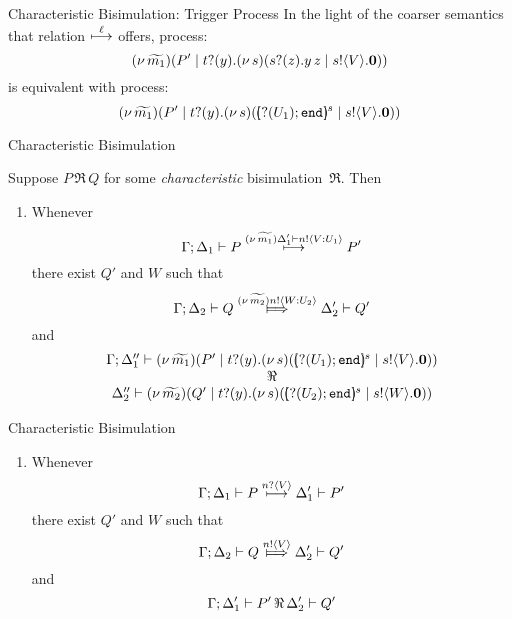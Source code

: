 \documentclass{beamer}
\begin{document}
	\begin{frame}{Characteristic Bisimulation: Trigger Process}
		In the light of the coarser semantics that
		relation $\stackrel{\ell}{\longmapsto}$ offers, process:
		\[
			(\nu\, \widetilde{m_1})(P' \;|\; t ? (y) .(\nu\, s)(s ? (z) . y\, {z} \;|\; s ! \langle V \rangle . \mathbf{0}))
		\]
		is equivalent with process:
		\[
			(\nu\, \widetilde{m_1})(P' \;|\; t ? (y) .(\nu\, s)([\!\!(? (U_1) ; \mathtt{end})\!\!]^{s} \;|\; s ! \langle V \rangle . \mathbf{0}))
		\]
	\end{frame}

	\begin{frame}{Characteristic Bisimulation}

		Suppose $P\, \Re\, Q$ for some {\em characteristic} bisimulation~$\Re$. Then
		\begin{enumerate}[$(\star)$]
			\item	Whenever
				\[
					\Gamma; \Delta_1 \vdash P \stackrel{(\nu\, \widetilde{m_1}) \Delta_1' \vdash n ! \langle V: U_1 \rangle}{\longmapsto} P'
				\]
				there exist $Q'$ and $W$ such that 
				\[
					\Gamma; \Delta_2 \proves Q \Hby{\news{\widetilde{m_2}} \bactout{n}{W: U_2}} \Delta_2' \proves Q'
				\]
				and
				\[
					\begin{array}{c}
						\Gamma; \Delta_1'' \proves \newsp{\widetilde{m_1}}{P' \Par \binp{t}{y}\newsp{s}{\mapchar{\btinp{U_1} \tinact}{s} \Par \bout{s}{V} \inact}}
						\\
						\Re
						\\
						\Delta_2'' \proves \newsp{\widetilde{m_2}}{Q' \Par \binp{t}{y}\newsp{s}{\mapchar{\btinp{U_2} \tinact}{s} \Par \bout{s}{W} \inact}}
					\end{array}
				\]
		\end{enumerate}
	\end{frame}

	\begin{frame}{Characteristic Bisimulation}

		\begin{enumerate}[$(\bullet)$]
			\item	Whenever
				\[
					\Gamma; \Delta_1 \vdash P \stackrel{n ? \langle V \rangle}{\longmapsto} \Delta_1' \vdash P'
				\]
				there exist $Q'$ and $W$ such that 
				\[
					\Gamma; \Delta_2 \proves Q \Hby{\bactout{n}{V}} \Delta_2' \proves Q'
				\]
				and
				\[
					\Gamma; \Delta_1' \vdash P'\, \Re\, \Delta_2' \vdash Q'
				\]
		\end{enumerate}
	\end{frame}
\end{document}
